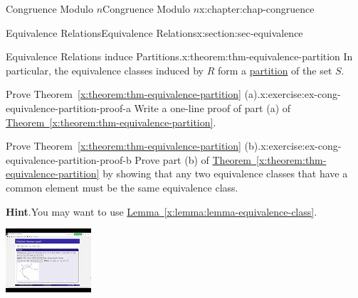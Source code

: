 \documentclass[oneside,10pt,]{book}
\newcommand{\blocktitlefont}{\relax}
\newcommand{\xreffont}{\relax}
\numberwithin{equation}{section}
\newlength{\qrsize}
\newlength{\previewwidth}
\begin{document}
\begin{chapterptx}{Congruence Modulo \(n\)}{}{Congruence Modulo \(n\)}{}{}{x:chapter:chap-congruence}
\begin{sectionptx}{Equivalence Relations}{}{Equivalence Relations}{}{}{x:section:sec-equivalence}
\begin{theorem}{Equivalence Relations induce Partitions.}{}{x:theorem:thm-equivalence-partition}
In particular, the equivalence classes induced by \(R\) form a \hyperref[x:definition:def-partition]{partition} of the set \(S\).%
\end{theorem}
\begin{inlineexercise}{Prove Theorem~{\xreffont\ref*{x:theorem:thm-equivalence-partition}} (a).}{x:exercise:ex-cong-equivalence-partition-proof-a}%
Write a one-line proof of part (a) of \hyperref[x:theorem:thm-equivalence-partition]{Theorem~{\xreffont\ref{x:theorem:thm-equivalence-partition}}}.%
\end{inlineexercise}%
\begin{inlineexercise}{Prove Theorem~{\xreffont\ref*{x:theorem:thm-equivalence-partition}} (b).}{x:exercise:ex-cong-equivalence-partition-proof-b}%
Prove part (b) of \hyperref[x:theorem:thm-equivalence-partition]{Theorem~{\xreffont\ref{x:theorem:thm-equivalence-partition}}} by showing that any two equivalence classes that have a common element must be the same equivalence class.%
\par\smallskip%
\noindent\textbf{\blocktitlefont Hint}.\hypertarget{g:hint:id532976}{}\quad{}You may want to use \hyperref[x:lemma:lemma-equivalence-class]{Lemma~{\xreffont\ref{x:lemma:lemma-equivalence-class}}}.%
\end{inlineexercise}%
\begin{sidebyside}{1}{0}{0}{0}%
\begin{sbspanel}{1}%
\setlength{\qrsize}{9em}
\setlength{\previewwidth}{\linewidth}
\addtolength{\previewwidth}{-\qrsize}
\begin{tcbraster}[raster columns=2, raster column skip=1pt, raster halign=center, raster force size=false, raster left skip=0pt, raster right skip=0pt]%
\begin{tcolorbox}[previewstyle, width=\previewwidth]%
\includegraphics[width=0.80\linewidth,height=\qrsize,keepaspectratio]{images/video-equivalence-class-2.jpg}%

\end{tcolorbox}
\end{tcbraster}
\end{sbspanel}
\end{sidebyside}
\end{sectionptx}
\end{chapterptx}
\end{document}
